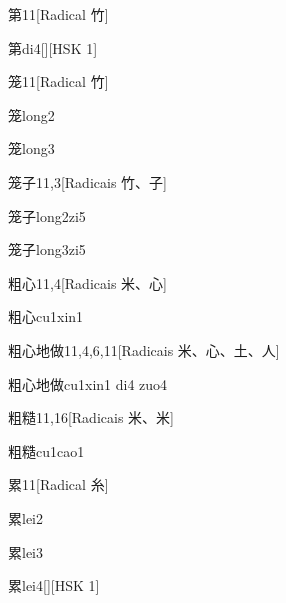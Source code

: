 \begin{entry}{第}{11}[Radical ⽵]
  \begin{phonetics}{第}{di4}[][HSK 1]
  \end{phonetics}
\end{entry}

\begin{entry}{笼}{11}[Radical ⽵]
  \begin{phonetics}{笼}{long2}
  \end{phonetics}
  \begin{phonetics}{笼}{long3}
  \end{phonetics}
\end{entry}

\begin{entry}{笼子}{11,3}[Radicais ⽵、⼦]
  \begin{phonetics}{笼子}{long2zi5}
  \end{phonetics}
  \begin{phonetics}{笼子}{long3zi5}
  \end{phonetics}
\end{entry}

\begin{entry}{粗心}{11,4}[Radicais ⽶、⼼]
  \begin{phonetics}{粗心}{cu1xin1}
  \end{phonetics}
\end{entry}

\begin{entry}{粗心地做}{11,4,6,11}[Radicais ⽶、⼼、⼟、⼈]
  \begin{phonetics}{粗心地做}{cu1xin1 di4 zuo4}
  \end{phonetics}
\end{entry}

\begin{entry}{粗糙}{11,16}[Radicais ⽶、⽶]
  \begin{phonetics}{粗糙}{cu1cao1}
  \end{phonetics}
\end{entry}

\begin{entry}{累}{11}[Radical ⽷]
  \begin{phonetics}{累}{lei2}
  \end{phonetics}
  \begin{phonetics}{累}{lei3}
  \end{phonetics}
  \begin{phonetics}{累}{lei4}[][HSK 1]
  \end{phonetics}
\end{entry}

